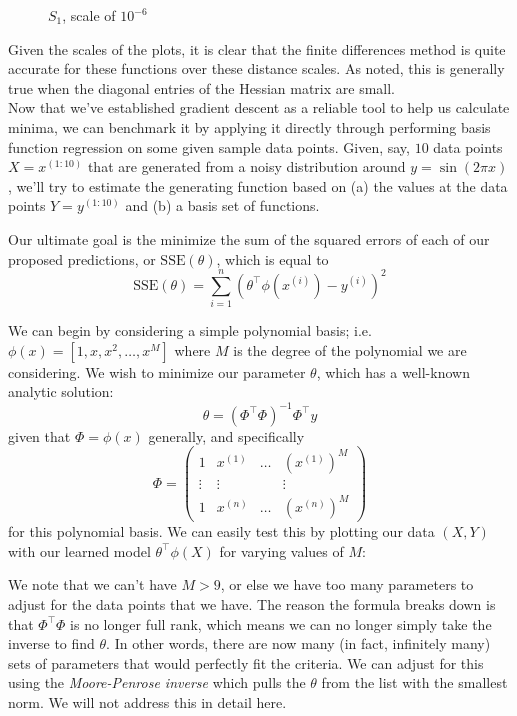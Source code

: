 \documentclass[11pt,letterpaper]{article}
\begin{document}
\begin{figure}[!htb]
  \caption{$S_1$, scale of $10^{-6}$}\label{fig:gradDifS}
\endminipage
\end{figure}

Given the scales of the plots, it is clear that the finite differences method is quite accurate for these functions over these distance scales. As noted, this is generally true when the diagonal entries of the Hessian matrix are small.\\

Now that we've established gradient descent as a reliable tool to help us calculate minima, we can benchmark it by applying it directly through performing basis function regression on some given sample data points. Given, say, $10$ data points $X = x^{(1:10)}$ that are generated from a noisy distribution around $y = \sin(2\pi x)$, we'll try to estimate the generating function based on (a) the values at the data points $Y = y^{(1:10)}$ and (b) a basis set of functions.

Our ultimate goal is the minimize the sum of the squared errors of each of our proposed predictions, or $\text{SSE}(\theta)$, which is equal to
\[ \text{SSE}(\theta) = \sum_{i=1}^n (\theta^\intercal\phi(x^{(i)}) - y^{(i)})^2 \]

We can begin by considering a simple polynomial basis; i.e. $\phi(x) = [1, x, x^2, \ldots , x^M]$ where $M$ is the degree of the polynomial we are considering. We wish to minimize our parameter $\theta$, which has a well-known analytic solution:
\[ \theta = (\Phi^\intercal\Phi)^{-1}\Phi^\intercal y \]
given that $\Phi = \phi(x)$ generally, and specifically
\[ \Phi = \left( \begin{array}{cccc}
 1 &  x^{(1)} & \ldots & (x^{(1)})^M \\
 \vdots & \vdots & & \vdots \\
 1 &  x^{(n)} & \ldots & (x^{(n)})^M \end{array} \right) \]
for this polynomial basis. We can easily test this by plotting our data $(X, Y)$ with our learned model $\theta^\intercal\phi(X)$ for varying values of $M$:

We note that we can't have $M > 9$, or else we have too many parameters to adjust for the data points that we have. The reason the formula breaks down is that $\Phi^\intercal\Phi$ is no longer full rank, which means we can no longer simply take the inverse to find $\theta$. In other words, there are now many (in fact, infinitely many) sets of parameters that would perfectly fit the criteria. We can adjust for this using the \textit{Moore-Penrose inverse} which pulls the $\theta$ from the list with the smallest norm. We will not address this in detail here.
\end{document}
